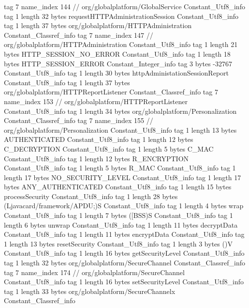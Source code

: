 {{{			tag	7
			name_index	144		// org/globalplatform/GlobalService
		}
		Constant_Utf8_info {
			tag	1
			length	32
			bytes	requestHTTPAdministrationSession
		}
		Constant_Utf8_info {
			tag	1
			length	37
			bytes	org/globalplatform/HTTPAdministration
		}
		Constant_Classref_info {
			tag	7
			name_index	147		// org/globalplatform/HTTPAdministration
		}
		Constant_Utf8_info {
			tag	1
			length	21
			bytes	HTTP_SESSION_NO_ERROR
		}
		Constant_Utf8_info {
			tag	1
			length	18
			bytes	HTTP_SESSION_ERROR
		}
		Constant_Integer_info {
			tag	3
			bytes	-32767
		}
		Constant_Utf8_info {
			tag	1
			length	30
			bytes	httpAdministationSessionReport
		}
		Constant_Utf8_info {
			tag	1
			length	37
			bytes	org/globalplatform/HTTPReportListener
		}
		Constant_Classref_info {
			tag	7
			name_index	153		// org/globalplatform/HTTPReportListener
		}
		Constant_Utf8_info {
			tag	1
			length	34
			bytes	org/globalplatform/Personalization
		}
		Constant_Classref_info {
			tag	7
			name_index	155		// org/globalplatform/Personalization
		}
		Constant_Utf8_info {
			tag	1
			length	13
			bytes	AUTHENTICATED
		}
		Constant_Utf8_info {
			tag	1
			length	12
			bytes	C_DECRYPTION
		}
		Constant_Utf8_info {
			tag	1
			length	5
			bytes	C_MAC
		}
		Constant_Utf8_info {
			tag	1
			length	12
			bytes	R_ENCRYPTION
		}
		Constant_Utf8_info {
			tag	1
			length	5
			bytes	R_MAC
		}
		Constant_Utf8_info {
			tag	1
			length	17
			bytes	NO_SECURITY_LEVEL
		}
		Constant_Utf8_info {
			tag	1
			length	17
			bytes	ANY_AUTHENTICATED
		}
		Constant_Utf8_info {
			tag	1
			length	15
			bytes	processSecurity
		}
		Constant_Utf8_info {
			tag	1
			length	28
			bytes	(Ljavacard/framework/APDU;)S
		}
		Constant_Utf8_info {
			tag	1
			length	4
			bytes	wrap
		}
		Constant_Utf8_info {
			tag	1
			length	7
			bytes	([BSS)S
		}
		Constant_Utf8_info {
			tag	1
			length	6
			bytes	unwrap
		}
		Constant_Utf8_info {
			tag	1
			length	11
			bytes	decryptData
		}
		Constant_Utf8_info {
			tag	1
			length	11
			bytes	encryptData
		}
		Constant_Utf8_info {
			tag	1
			length	13
			bytes	resetSecurity
		}
		Constant_Utf8_info {
			tag	1
			length	3
			bytes	()V
		}
		Constant_Utf8_info {
			tag	1
			length	16
			bytes	getSecurityLevel
		}
		Constant_Utf8_info {
			tag	1
			length	32
			bytes	org/globalplatform/SecureChannel
		}
		Constant_Classref_info {
			tag	7
			name_index	174		// org/globalplatform/SecureChannel
		}
		Constant_Utf8_info {
			tag	1
			length	16
			bytes	setSecurityLevel
		}
		Constant_Utf8_info {
			tag	1
			length	33
			bytes	org/globalplatform/SecureChannelx
		}
		Constant_Classref_info {
}}}
